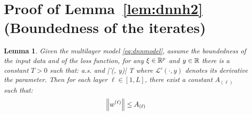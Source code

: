 \documentclass[11pt]{article}
\newtheorem*{Lemma*}{Lemma}
\theoremstyle{k}
\begin{document}
\section{Proof of Lemma~\ref{lem:dnnh2} (Boundedness of the iterates)}\label{app:lemdnnh2}
\begin{Lemma*}
Given the multilayer model \eqref{eq:dnnmodel}, assume the boundedness of the input data and of the loss function, \ie for any $\xi \in \mathbb{R}^p$ and $y \in \mathbb{R}$ there is a constant $T >0$ such that:
\beq\label{eq:mildassumptions}
\norm{\xi}  \quad \textrm{a.s.} \quad \textrm{and} |'(\cdot, y)| \leq T
\eeq
where $\mathcal{L}'(\cdot, y)$ denotes its derivative \wrt the parameter. Then for each layer $\ell \in [1,L]$, there exist a constant $A_{(\ell)}$ such that:
$$
\left\Vert w^{(\ell)} \right\Vert \leq A_{(\ell)}
$$
\end{Lemma*}
\end{document}
